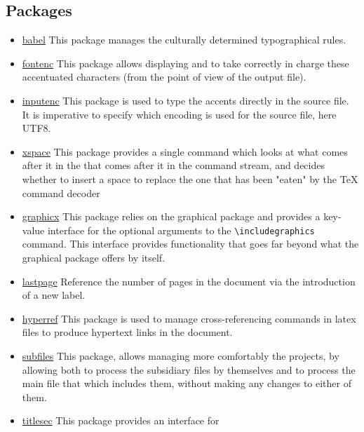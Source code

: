 \subsection{Packages}

\begin{itemize}
    \item \href{https://www.ctan.org/pkg/babel}{babel} This package manages the culturally
          determined typographical rules.
    \item \href{https://ctan.org/pkg/fontenc}{fontenc} This package allows displaying and
          to take correctly in charge these accentuated characters (from the point of view of the
          output file).
    \item \href{https://www.ctan.org/pkg/inputenc}{inputenc} This package is used to type the
          accents directly in the source file. It is imperative to specify which encoding is used
          for the source file, here UTF8.
    \item \href{https://www.ctan.org/pkg/inputenc}{xspace} This package provides a single command
          which looks at what comes after it in the that comes after it in the command stream, and
          decides whether to insert a space to replace the one that has been "eaten" by the TeX
          command decoder
    \item \href{https://www.ctan.org/pkg/graphicx}{graphicx} This package relies on
          the graphical package and provides a key-value interface for the optional arguments to the
          \verb=\includegraphics= command. This interface provides functionality that goes far
          beyond what the graphical package offers by itself.
    \item \href{https://www.ctan.org/pkg/lastpage}{lastpage} Reference the number of pages in the
          document via the introduction of a new label.
    \item \href{https://www.ctan.org/pkg/hyperref}{hyperref} This package is used
          to manage cross-referencing commands in \gls{latex} files to produce hypertext links in
          the document.
    \item \href{https://www.ctan.org/pkg/subfiles}{subfiles} This package, allows managing more
          comfortably the projects, by allowing both to process the subsidiary files by themselves
          and to process the main file that which includes them, without making any changes to
          either of them.
    \item \href{https://www.ctan.org/pkg/titlesec}{titlesec} This package provides an interface for

\end{itemize}
